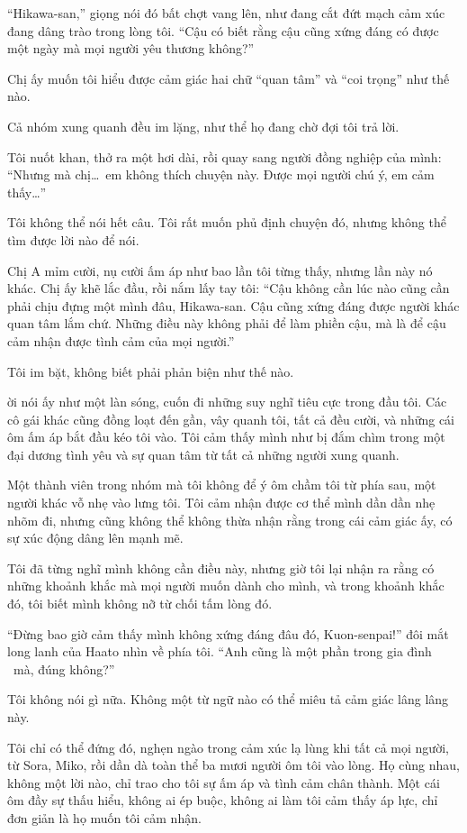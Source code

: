 \documentclass[../main.tex]{subfiles}
\begin{document}
``Hikawa-san,'' giọng nói đó bất chợt vang lên, như đang cắt đứt mạch cảm xúc đang dâng trào trong lòng tôi. ``Cậu có biết rằng cậu cũng xứng đáng có được một ngày mà mọi người yêu thương không?''

Chị ấy muốn tôi hiểu được cảm giác hai chữ ``quan tâm'' và ``coi trọng'' như thế nào.

Cả nhóm xung quanh đều im lặng, như thể họ đang chờ đợi tôi trả lời.

Tôi nuốt khan, thở ra một hơi dài, rồi quay sang người đồng nghiệp của mình: ``Nhưng mà chị\dots\ em không thích chuyện này. Được mọi người chú ý, em cảm thấy\dots''

Tôi không thể nói hết câu. Tôi rất muốn phủ định chuyện đó, nhưng không thể tìm được lời nào để nói.

Chị A mỉm cười, nụ cười ấm áp như bao lần tôi từng thấy, nhưng lần này nó khác. Chị ấy khẽ lắc đầu, rồi nắm lấy tay tôi: ``Cậu không cần lúc nào cũng cần phải chịu đựng một mình đâu, Hikawa-san. Cậu cũng xứng đáng được người khác quan tâm lắm chứ. Những điều này không phải để làm phiền cậu, mà là để cậu cảm nhận được tình cảm của mọi người.''

Tôi im bặt, không biết phải phản biện như thế nào.

ời nói ấy như một làn sóng, cuốn đi những suy nghĩ tiêu cực trong đầu tôi. Các cô gái khác cũng đồng loạt đến gần, vây quanh tôi, tất cả đều cười, và những cái ôm ấm áp bắt đầu kéo tôi vào. Tôi cảm thấy mình như bị đắm chìm trong một đại dương tình yêu và sự quan tâm từ tất cả những người xung quanh.

Một thành viên trong nhóm mà tôi không để ý ôm chầm tôi từ phía sau, một người khác vỗ nhẹ vào lưng tôi.  Tôi cảm nhận được cơ thể mình dần dần nhẹ nhõm đi, nhưng cũng không thể không thừa nhận rằng trong cái cảm giác ấy, có sự xúc động dâng lên mạnh mẽ.

Tôi đã từng nghĩ mình không cần điều này, nhưng giờ tôi lại nhận ra rằng có những khoảnh khắc mà mọi người muốn dành cho mình, và trong khoảnh khắc đó, tôi biết mình không nỡ từ chối tấm lòng đó.

``Đừng bao giờ cảm thấy mình không xứng đáng đâu đó, Kuon-senpai!'' đôi mắt long lanh của Haato nhìn về phía tôi. ``Anh cũng là một phần trong gia đình \hll\ mà, đúng không?''

Tôi không nói gì nữa. Không một từ ngữ nào có thể miêu tả cảm giác lâng lâng này.

Tôi chỉ có thể đứng đó, nghẹn ngào trong cảm xúc lạ lùng khi tất cả mọi người, từ Sora, Miko, rồi dần dà toàn thể ba mươi người ôm tôi vào lòng. Họ cùng nhau, không một lời nào, chỉ trao cho tôi sự ấm áp và tình cảm chân thành. Một cái ôm đầy sự thấu hiểu, không ai ép buộc, không ai làm tôi cảm thấy áp lực, chỉ đơn giản là họ muốn tôi cảm nhận.
\end{document}

